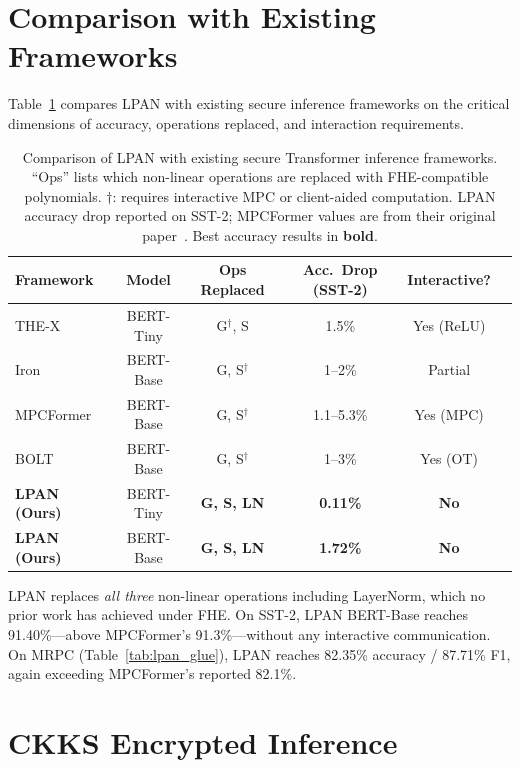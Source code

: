 \section{Comparison with Existing Frameworks}
\label{sec:comparison}

Table~\ref{tab:sota_comparison} compares LPAN with existing secure inference frameworks on the critical dimensions of accuracy, operations replaced, and interaction requirements.

\begin{table}[ht]
\centering
\caption{Comparison of LPAN with existing secure Transformer inference frameworks. ``Ops'' lists which non-linear operations are replaced with FHE-compatible polynomials. $\dagger$: requires interactive MPC or client-aided computation. LPAN accuracy drop reported on SST-2; MPCFormer values are from their original paper~\cite{li2023mpcformer}. Best accuracy results in \textbf{bold}.}
\label{tab:sota_comparison}
\begin{tabular}{lccccc}
\toprule
\textbf{Framework} & \textbf{Model} & \textbf{Ops Replaced} & \textbf{Acc.\ Drop (SST-2)} & \textbf{Interactive?} \\
\midrule
THE-X~\cite{chen2022thex}       & BERT-Tiny & G$^\dagger$, S & 1.5\%     & Yes (ReLU) \\
Iron~\cite{hao2022iron}         & BERT-Base & G, S$^\dagger$  & 1--2\%   & Partial \\
MPCFormer~\cite{li2023mpcformer} & BERT-Base & G, S$^\dagger$ & 1.1--5.3\% & Yes (MPC) \\
BOLT~\cite{pang2024bolt}        & BERT-Base & G, S$^\dagger$  & 1--3\%   & Yes (OT) \\
\midrule
\textbf{LPAN (Ours)} & BERT-Tiny  & \textbf{G, S, LN} & \textbf{0.11\%} & \textbf{No} \\
\textbf{LPAN (Ours)} & BERT-Base  & \textbf{G, S, LN} & \textbf{1.72\%} & \textbf{No} \\
\bottomrule
\end{tabular}
\end{table}

LPAN replaces \emph{all three} non-linear operations including LayerNorm, which no prior work has achieved under FHE. On SST-2, LPAN BERT-Base reaches 91.40\%---above MPCFormer's 91.3\%---without any interactive communication. On MRPC (Table~\ref{tab:lpan_glue}), LPAN reaches 82.35\% accuracy / 87.71\% F1, again exceeding MPCFormer's reported 82.1\%.


\section{CKKS Encrypted Inference}
\label{sec:encrypted_inference}

